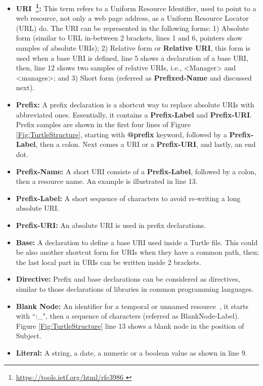 \begin{itemize}
    \item \textbf{URI~\footnote{\url{https://tools.ietf.org/html/rfc3986
}}:} This term refers to a Uniform Resource Identifier, used to point to a web resource, not only a web page address, as a Uniform Resource Locator (URL) do. 
The URI can be represented in the following forms: 1) Absolute form (similar to URL in-between 2 brackets, lines 1 and 6, pointers show samples of absolute URIs); 
2) Relative form or \textbf{Relative URI}, this form is used when a base URI is defined, line 5 shows a declaration of a base URI, then, line 12 shows two samples of relative URIs, i.e., \textless Manager\textgreater{}      and \textless manages\textgreater; and 
3) Short form (referred as \textbf{Prefixed-Name} and discussed next).
  \item \textbf{Prefix:} A prefix declaration is a shortcut way to replace absolute URIs with abbreviated ones. Essentially, it contains a \textbf{Prefix-Label} and \textbf{Prefix-URI}. 
  Prefix samples are shown in the first four lines of Figure \ref{Fig:TurtleStructure}, starting with \textbf{@prefix} keyword, followed by a \textbf{Prefix-Label}, then a colon. Next comes a URI or a \textbf{Prefix-URI}, and lastly, an end dot. 
 \item \textbf{Prefix-Name:} A short URI consists of a \textbf{Prefix-Label}, followed by a colon, then a resource name. An example is illustrated in line 13.
        
  \item \textbf{Prefix-Label:} A short sequence of characters to avoid re-writing a long absolute URI.
  \item \textbf{Prefix-URI:} An absolute URI is used in prefix declarations. 
  \item \textbf{Base:} A declaration to define a base URI used inside a Turtle file. 
  This could be also another shortcut form for URIs when they have a common path, then; the last local part in URIs can be written inside 2 brackets. 
        
\item \textbf{Directive:} Prefix and base declarations can be considered as directives, similar to those declarations of libraries in common programming languages.  
    \item \textbf{Blank Node:} An identifier for a temporal or unnamed resource~\cite{journals:tkde:GutierrezHV07}, it starts with ``:\_", then a sequence of characters (referred as BlankNode-Label). 
    Figure \ref{Fig:TurtleStructure} line 13 shows a blank node in the position of Subject.  
    \item \textbf{Literal:} A string, a date, a numeric or a boolean value as shown in line 9.
\end{itemize} 

